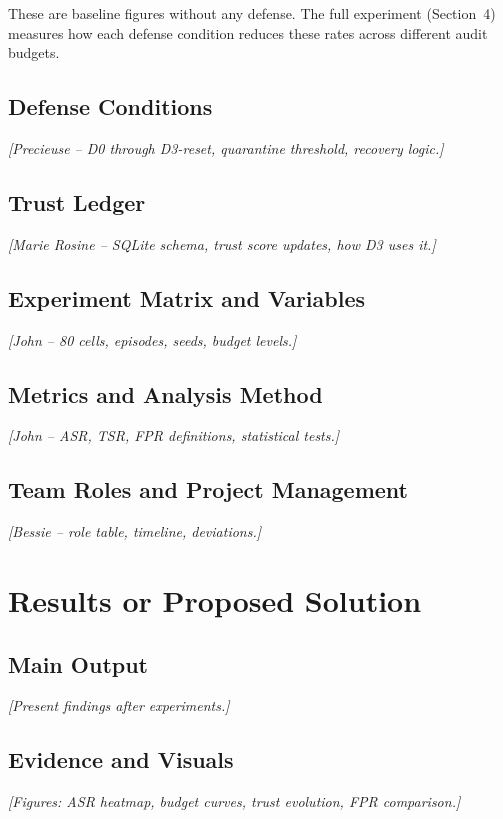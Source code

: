 \documentclass[a4paper, 11pt]{article}
\begin{document}
These are baseline figures without any defense. The full experiment (Section~4) measures how each defense condition reduces these rates across different audit budgets.


\subsection{Defense Conditions}
\textit{[Precieuse -- D0 through D3-reset, quarantine threshold, recovery logic.]}

\subsection{Trust Ledger}
\textit{[Marie Rosine -- SQLite schema, trust score updates, how D3 uses it.]}

\subsection{Experiment Matrix and Variables}
\textit{[John -- 80 cells, episodes, seeds, budget levels.]}

\subsection{Metrics and Analysis Method}
\textit{[John -- ASR, TSR, FPR definitions, statistical tests.]}

\subsection{Team Roles and Project Management}
\textit{[Bessie -- role table, timeline, deviations.]}

\newpage

\section{Results or Proposed Solution}

\subsection{Main Output}
\textit{[Present findings after experiments.]}

\subsection{Evidence and Visuals}
\textit{[Figures: ASR heatmap, budget curves, trust evolution, FPR comparison.]}
\end{document}
